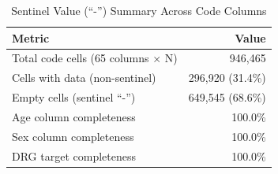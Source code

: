 \begin{table}[t]
\centering
\caption{Sentinel Value (``-'') Summary Across Code Columns}
\label{tab:missingness}
\begin{tabular}{lr}
\toprule
\textbf{Metric} & \textbf{Value} \\
\midrule
Total code cells (65 columns $\times$ N) & 946,465 \\
Cells with data (non-sentinel) & 296,920 (31.4\%) \\
Empty cells (sentinel ``-'') & 649,545 (68.6\%) \\
\midrule
Age column completeness & 100.0\% \\
Sex column completeness & 100.0\% \\
DRG target completeness & 100.0\% \\
\bottomrule
\end{tabular}
\end{table}